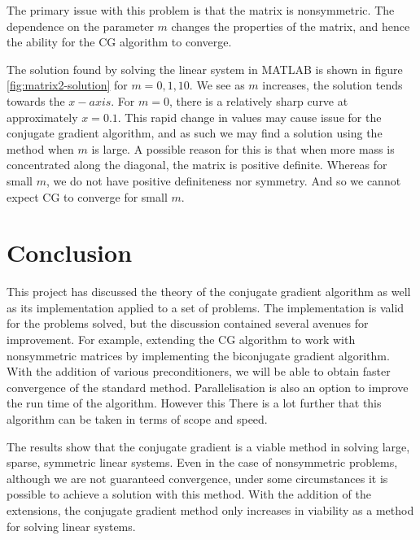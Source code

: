 The primary issue with this problem is that the matrix is nonsymmetric.
The dependence on the parameter $m$ changes the properties of the matrix, and hence the ability for the CG algorithm to converge.

The solution found by solving the linear system in MATLAB is shown in figure \ref{fig:matrix2-solution} for $m=0,1,10$.
We see as $m$ increases, the solution tends towards the $x-axis$.
For $m=0$, there is a relatively sharp curve at approximately $x=0.1$. 
This rapid change in values may cause issue for the conjugate gradient algorithm, and as such we may find a solution using the method when $m$ is large.
A possible reason for this is that when more mass is concentrated along the diagonal, the matrix is positive definite.
Whereas for small $m$, we do not have positive definiteness nor symmetry.
And so we cannot expect CG to converge for small $m$.


\section{Conclusion}

\iffalse
    Conclusion draws together strands of work throughout the report, 
    demonstrating how the results obtained relate to each other and 
    the broader context of the mathematical problem.

Discussion of results in context of problem
Talk about related algorithms
> BiCG
Preconditioning
Parallelisation, optimisations
Results
\fi

This project has discussed the theory of the conjugate gradient algorithm as well as its implementation applied to a set of problems.
The implementation is valid for the problems solved, but the discussion contained several avenues for improvement. 
For example, extending the CG algorithm to work with nonsymmetric matrices by implementing the biconjugate gradient algorithm.
With the addition of various preconditioners, we will be able to obtain faster convergence of the standard method.
Parallelisation is also an option to improve the run time of the algorithm.
However this 
There is a lot further that this algorithm can be taken in terms of scope and speed.

The results show that the conjugate gradient is a viable method in solving large, sparse, symmetric linear systems.
Even in the case of nonsymmetric problems, although we are not guaranteed convergence, under some circumstances it is possible to achieve a solution with this method.
With the addition of the extensions, the conjugate gradient method only increases in viability as a method for solving linear systems.


